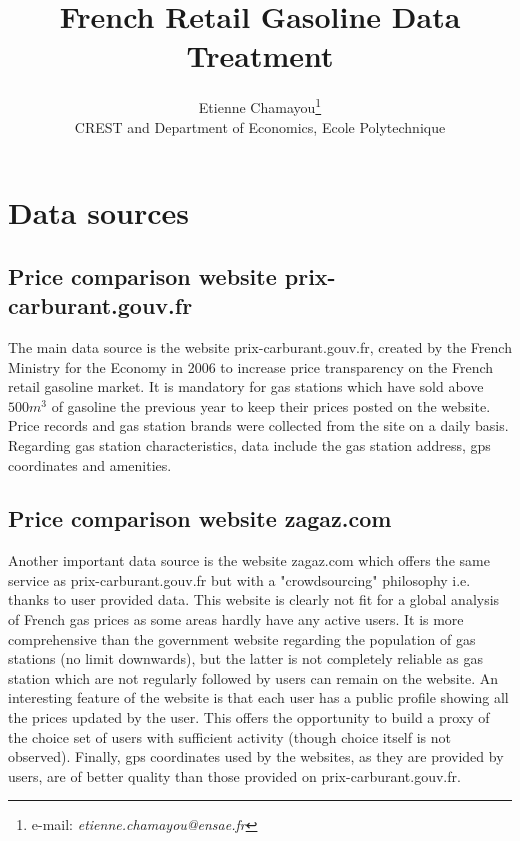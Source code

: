 \documentclass[11pt]{article}
\begin{document}
\title{French Retail Gasoline Data Treatment}
\author{Etienne Chamayou\thanks{e-mail:
\textit{etienne.chamayou@ensae.fr}}\medskip\\{\normalsize CREST and Department of Economics, Ecole Polytechnique }}
\maketitle

\sloppy%

\onehalfspacing


\strut


\strut


\pagebreak%
\doublespacing

\section{Data sources}

\subsection{Price comparison website prix-carburant.gouv.fr}

The main data source is the website prix-carburant.gouv.fr, created by the French Ministry for the Economy in 2006 to increase price transparency on the French retail gasoline market. It is mandatory for gas stations which have sold above $500m^3$ of gasoline the previous year to keep their prices posted on the website. Price records and gas station brands were collected from the site on a daily basis. Regarding gas station characteristics, data include the gas station address, gps coordinates and amenities.

\subsection{Price comparison website zagaz.com}

Another important data source is the website zagaz.com which offers the same service as prix-carburant.gouv.fr but with a "crowdsourcing" philosophy i.e. thanks to user provided data. This website is clearly not fit for a global analysis of French gas prices as some areas hardly have any active users. It is more comprehensive than the government website regarding the population of gas stations (no limit downwards), but the latter is not completely reliable as gas station which are not regularly followed by users can remain on the website. An interesting feature of the website is that each user has a public profile showing all the prices updated by the user. This offers the opportunity to build a proxy of the choice set of users with sufficient activity (though choice itself is not observed). Finally, gps coordinates used by the websites, as they are provided by users, are of better quality than those provided on prix-carburant.gouv.fr.
\end{document}
